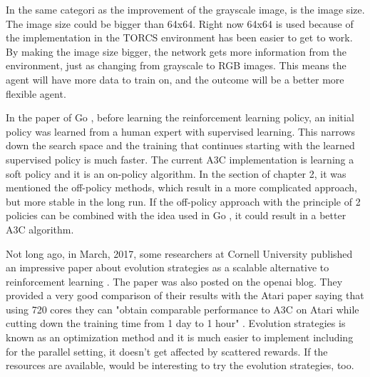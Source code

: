 In the same categori as the improvement of the grayscale image, is the image size. The image size could be bigger than 64x64. Right now 64x64 is used because of the implementation in the TORCS environment has been easier to get to work. By making the image size bigger, the network gets more information from the environment, just as changing from grayscale to RGB images. This means the agent will have more data to train on, and the outcome will be a better more flexible agent. 

In the paper of Go \cite{Silver_2016}, before learning the reinforcement learning policy, an initial policy was learned from a human expert with supervised learning. This narrows down the search space and the training that continues starting with the learned supervised policy is much faster. The current A3C implementation is learning a soft policy and it is an on-policy algorithm. In the  section of chapter 2, it was mentioned the off-policy methods, which result in a more complicated approach, but more stable in the long run. If the off-policy approach with the principle of 2 policies can be combined with the idea used in Go \cite{Silver_2016}, it could result in a better A3C algorithm.

Not long ago, in March, 2017, some researchers at Cornell University published an impressive paper about evolution strategies as a scalable alternative to reinforcement learning \cite{EvolStrat}. The paper was also posted on the openai blog. They provided a very good comparison of their results with the Atari paper \cite{DBLP:journals/corr/MnihKSGAWR13} saying that using 720 cores they can "obtain comparable performance to A3C on Atari while cutting down the training time from 1 day to 1 hour" \cite{EvolStrat}. Evolution strategies is known as an optimization method and it is much easier to implement including for the parallel setting, it doesn't get affected by scattered rewards. If the resources are available, would be interesting to try the evolution strategies, too.